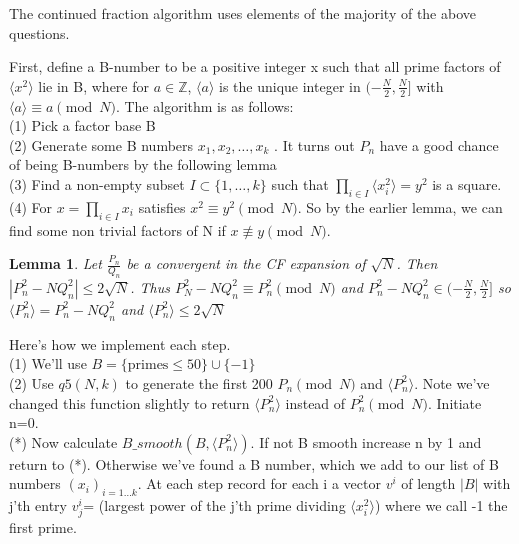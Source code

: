 \documentclass[10pt,a4paper]{report}
\newtheorem*{lemma}{Lemma}
\begin{document}
The continued fraction algorithm uses elements of the majority of the above questions. 

First, define a B-number to be a positive integer x such that all prime factors of $\langle x^2 \rangle$ lie in B, where for $a\in\mathbb{Z}$, $\langle a \rangle$ is the unique integer in $(-\frac{N}{2}, \frac{N}{2}]$ with $\langle a \rangle \equiv a \pmod N$. The algorithm is as follows:\\

(1) Pick a factor base B\\
(2) Generate some B numbers $x_1, x_2, \dots, x_k$ . It turns out $P_n$ have a good chance of being B-numbers by the following lemma\\
(3) Find a non-empty subset $I\subset\{1, \dots ,k\}$ such that $\prod_{i\in I}\langle x_i^2 \rangle=y^2$ is a square.\\
(4) For $x=\prod_{i\in I}x_i$ satisfies $x^2\equiv y^2 \pmod N$. So by the earlier lemma, we can find some non trivial factors of N if $x\not\equiv y \pmod N$. \\

\begin{lemma}
Let $\frac{P_n}{Q_n}$ be a convergent in the CF expansion of $\sqrt{N}$. Then $|P_n^2-NQ_n^2|\leq2\sqrt{N}$. Thus $P_N^2-NQ_n^2 \equiv P_n^2 \pmod N$ and $P_n^2-NQ_n^2 \in (-\frac{N}{2}, \frac{N}{2}]$ so $\langle P_n^2\rangle = P_n^2-NQ_n^2$ and $\langle P_n^2\rangle\leq2\sqrt{N}$
\end{lemma}

Here's how we implement each step.\\

(1) We'll use $B=\{\text{primes}\leq 50\} \cup \{-1\}$\\

(2) Use $q5(N,k)$ to generate the first 200 $P_n \pmod N$ and $\langle P_n^2 \rangle$. Note we've changed this function slightly to return 
 $\langle P_n^2 \rangle$ instead of $P_n^2 \pmod N$. Initiate n=0.\\

(*) Now calculate $B\_smooth(B, \langle P_n^2 \rangle)$. If not B smooth increase n by 1 and return to (*). Otherwise we've found a B number, which we add to our list of B numbers $(x_i)_{i=1\dots k}$. At each step record for each i a vector  $v^{i}$ of length $|B|$ with j'th entry $v^{i}_j$= (largest power of the j'th prime dividing $\langle x_i^2 \rangle$) where we call -1 the first prime.\\
 
\end{document}
